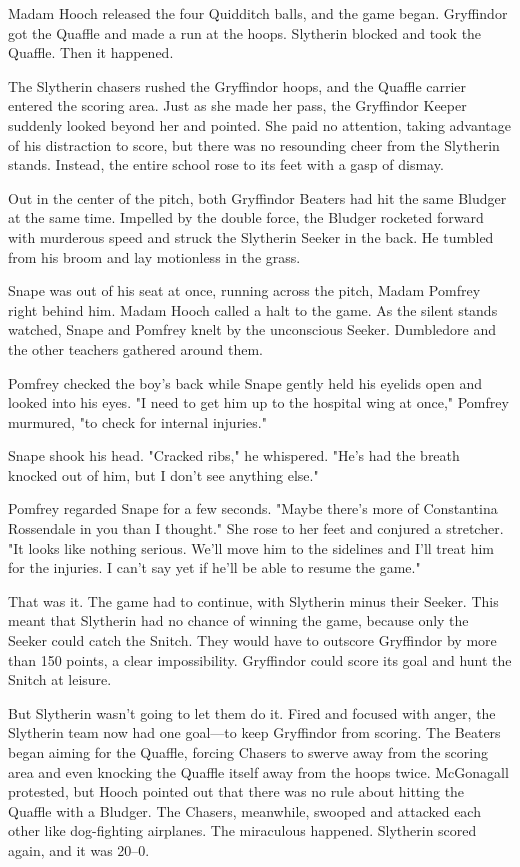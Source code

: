 Madam Hooch released the four Quidditch balls, and the game began. Gryffindor got the Quaffle and made a run at the hoops. Slytherin blocked and took the Quaffle. Then it happened.

The Slytherin chasers rushed the Gryffindor hoops, and the Quaffle carrier entered the scoring area. Just as she made her pass, the Gryffindor Keeper suddenly looked beyond her and pointed. She paid no attention, taking advantage of his distraction to score, but there was no resounding cheer from the Slytherin stands. Instead, the entire school rose to its feet with a gasp of dismay.

Out in the center of the pitch, both Gryffindor Beaters had hit the same Bludger at the same time. Impelled by the double force, the Bludger rocketed forward with murderous speed and struck the Slytherin Seeker in the back. He tumbled from his broom and lay motionless in the grass.

Snape was out of his seat at once, running across the pitch, Madam Pomfrey right behind him. Madam Hooch called a halt to the game. As the silent stands watched, Snape and Pomfrey knelt by the unconscious Seeker. Dumbledore and the other teachers gathered around them.

Pomfrey checked the boy's back while Snape gently held his eyelids open and looked into his eyes. "I need to get him up to the hospital wing at once," Pomfrey murmured, "to check for internal injuries."

Snape shook his head. "Cracked ribs," he whispered. "He's had the breath knocked out of him, but I don't see anything else."

Pomfrey regarded Snape for a few seconds. "Maybe there's more of Constantina Rossendale in you than I thought." She rose to her feet and conjured a stretcher. "It looks like nothing serious. We'll move him to the sidelines and I'll treat him for the injuries. I can't say yet if he'll be able to resume the game."

That was it. The game had to continue, with Slytherin minus their Seeker. This meant that Slytherin had no chance of winning the game, because only the Seeker could catch the Snitch. They would have to outscore Gryffindor by more than 150 points, a clear impossibility. Gryffindor could score its goal and hunt the Snitch at leisure.

But Slytherin wasn't going to let them do it. Fired and focused with anger, the Slytherin team now had one goal—to keep Gryffindor from scoring. The Beaters began aiming for the Quaffle, forcing Chasers to swerve away from the scoring area and even knocking the Quaffle itself away from the hoops twice. McGonagall protested, but Hooch pointed out that there was no rule about hitting the Quaffle with a Bludger. The Chasers, meanwhile, swooped and attacked each other like dog-fighting airplanes. The miraculous happened. Slytherin scored again, and it was 20--0.

